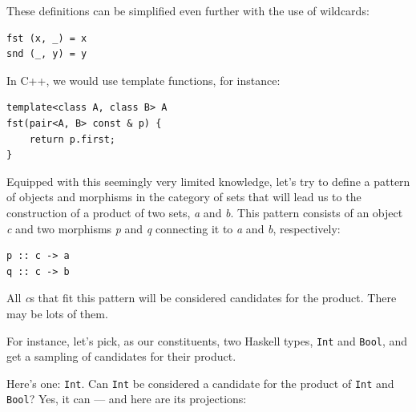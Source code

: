 These definitions can be simplified even further with the use of
wildcards:

\begin{verbatim}
fst (x, _) = x
snd (_, y) = y
\end{verbatim}

In C++, we would use template functions, for instance:

\begin{verbatim}
template<class A, class B> A
fst(pair<A, B> const & p) {
    return p.first;
}
\end{verbatim}

Equipped with this seemingly very limited knowledge, let's try to define
a pattern of objects and morphisms in the category of sets that will
lead us to the construction of a product of two sets, \emph{a} and
\emph{b}. This pattern consists of an object \emph{c} and two morphisms
\emph{p} and \emph{q} connecting it to \emph{a} and \emph{b},
respectively:

\begin{verbatim}
p :: c -> a
q :: c -> b
\end{verbatim}

\begin{figure}[H]
  \centering
\end{figure}

\noindent
All \emph{c}s that fit this pattern will be considered candidates for
the product. There may be lots of them.

\begin{figure}[H]
  \centering
\end{figure}

\noindent
For instance, let's pick, as our constituents, two Haskell types,
\texttt{Int} and \texttt{Bool}, and get a sampling of candidates for
their product.

Here's one: \texttt{Int}. Can \texttt{Int} be considered a candidate for
the product of \texttt{Int} and \texttt{Bool}? Yes, it can --- and here
are its projections:

